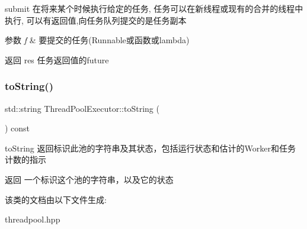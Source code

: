 submit 在将来某个时候执行给定的任务, 任务可以在新线程或现有的合并的线程中执行, 可以有返回值,向任务队列提交的是任务副本 


\begin{DoxyParams}{参数}
{\em f} & 要提交的任务(Runnable或函数或lambda)\\
\hline
\end{DoxyParams}
\begin{DoxyReturn}{返回}
res 任务返回值的future 
\end{DoxyReturn}
\mbox{\label{classThreadPoolExecutor_af85a124c9169a546bfbd725725024527}} 
\subsubsection{\texorpdfstring{to\+String()}{toString()}}
{\footnotesize\ttfamily std\+::string Thread\+Pool\+Executor\+::to\+String (\begin{DoxyParamCaption}{ }\end{DoxyParamCaption}) const}



to\+String 返回标识此池的字符串及其状态，包括运行状态和估计的\+Worker和任务计数的指示 

\begin{DoxyReturn}{返回}
一个标识这个池的字符串，以及它的状态 
\end{DoxyReturn}


该类的文档由以下文件生成\+:\begin{DoxyCompactItemize}
\item 
threadpool.\+hpp\end{DoxyCompactItemize}
